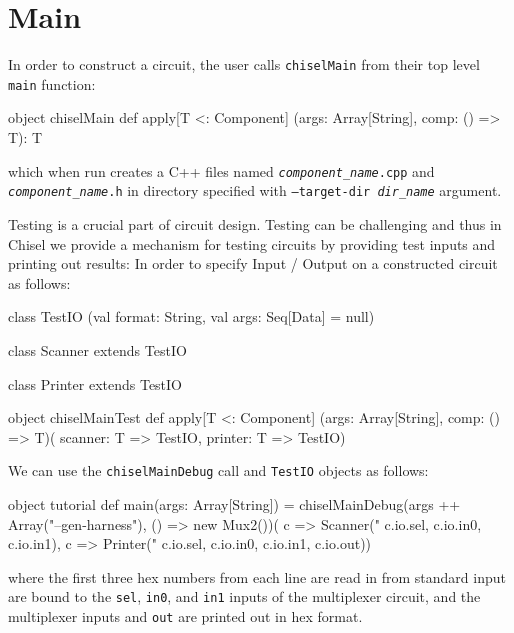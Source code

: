 \documentclass[10pt,twocolumn]{article}
\def\code#1{{\small\tt #1}}
\begin{document}
\section{Main}

In order to construct a circuit, 
the user calls \code{chiselMain} from their top level \code{main} function:

\begin{scala}
object chiselMain {
  def apply[T <: Component]
    (args: Array[String], comp: () => T): T
}
\end{scala}

\noindent
which when run creates a C++ files named
\code{{\it component\_name}.cpp} and \code{{\it component\_name}.h} in directory specified with
\code{--target-dir {\it dir\_name}} argument.

Testing is a crucial part of circuit design.
Testing can be challenging and thus in Chisel we provide a mechanism for
testing circuits by providing test inputs and printing out results:
In order to specify Input / Output on a constructed circuit as follows:

\begin{scala}
class TestIO
  (val format: String, val args: Seq[Data] = null)

class Scanner extends TestIO

class Printer extends TestIO

object chiselMainTest {
  def apply[T <: Component]
    (args: Array[String], comp: () => T)(
     scanner: T => TestIO, 
     printer: T => TestIO)
}
\end{scala}

\noindent

We can use the \code{chiselMainDebug} call and \code{TestIO} objects as follows:

\begin{scala}
object tutorial {
  def main(args: Array[String]) = {
    chiselMainDebug(args ++ Array("--gen-harness"), 
                    () => new Mux2())(
      c => Scanner("%
                   c.io.sel, c.io.in0, c.io.in1),
      c => Printer("%
                   c.io.sel, c.io.in0, c.io.in1, 
                   c.io.out))
  }
}
\end{scala}

\noindent
where the first three hex numbers from each line are read in from
standard input are bound to the \code{sel}, \code{in0},  and
\code{in1} inputs of the multiplexer circuit, and the multiplexer
inputs and \code{out} are printed out in hex format.  
\end{document}
